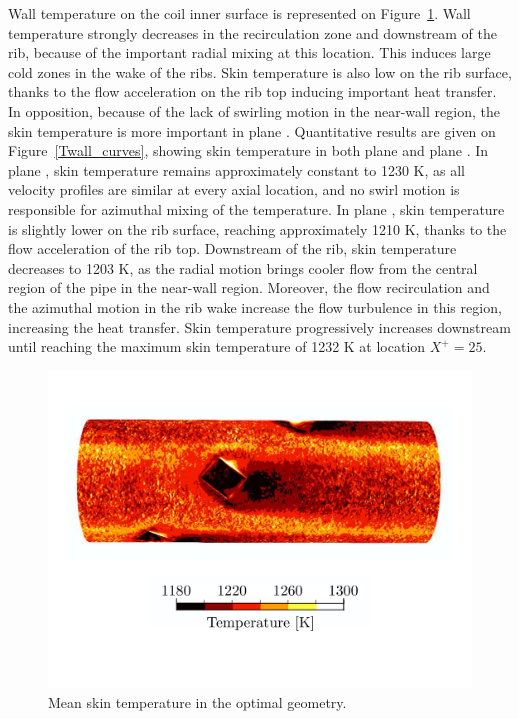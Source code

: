 Wall temperature on the coil inner surface is represented on Figure~\ref{Twall}. Wall temperature strongly decreases in the recirculation zone and downstream of the rib, because of the important radial mixing at this location. This induces large cold zones in the wake of the ribs. Skin temperature is also low on the rib surface, thanks to the flow acceleration on the rib top inducing important heat transfer. In opposition, because of the lack of swirling motion in the near-wall region, the skin temperature is more important in plane . Quantitative results are given on Figure~\ref{Twall_curves}, showing skin temperature in both plane  and plane . In plane , skin temperature remains approximately constant to 1230 K, as all velocity profiles are similar at every axial location, and no swirl motion is responsible for azimuthal mixing of the temperature. In plane , skin temperature is slightly lower on the rib surface, reaching approximately 1210 K, thanks to the flow acceleration of the rib top. Downstream of the rib, skin temperature decreases to 1203 K, as the radial motion brings cooler flow from the central region of the pipe in the near-wall region. Moreover, the flow recirculation and the azimuthal motion in the rib wake increase the flow turbulence in this region, increasing the heat transfer. Skin temperature progressively increases downstream until reaching the maximum skin temperature of 1232 K at location $X^+=25$.

\begin{figure}[!ht]
\centering
\includegraphics[width=\linewidth]{fig/applications/optim/Twall.pdf}
\caption{Mean skin temperature in the optimal geometry.}
\label{Twall}
\end{figure}

